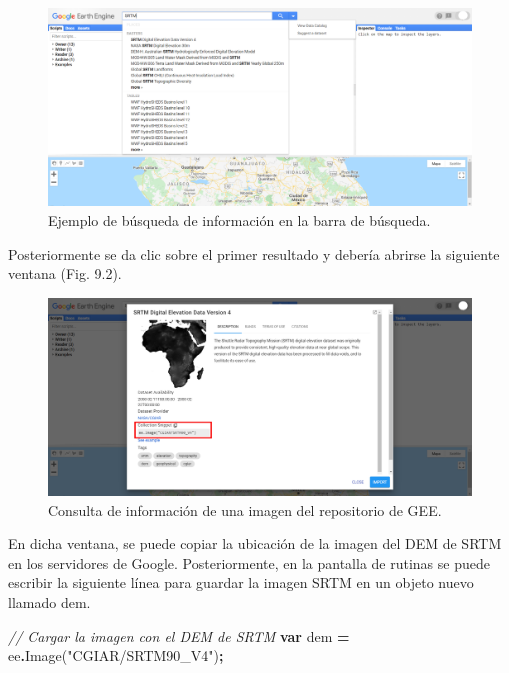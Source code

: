 \documentclass[
  12pt,
  letterpaper,
  twoside]{book}
\newenvironment{Shaded}{\begin{snugshade}}{\end{snugshade}}
\newcommand{\CommentTok}[1]{\textcolor[rgb]{0.56,0.35,0.01}{\textit{#1}}}
\newcommand{\FunctionTok}[1]{\textcolor[rgb]{0.00,0.00,0.00}{#1}}
\newcommand{\KeywordTok}[1]{\textcolor[rgb]{0.13,0.29,0.53}{\textbf{#1}}}
\newcommand{\NormalTok}[1]{#1}
\newcommand{\OperatorTok}[1]{\textcolor[rgb]{0.81,0.36,0.00}{\textbf{#1}}}
\newcommand{\StringTok}[1]{\textcolor[rgb]{0.31,0.60,0.02}{#1}}
\begin{document}
\begin{figure}[btp]

{\centering \includegraphics[width=1\linewidth]{Img/SRTM} 

}

\caption{Ejemplo de búsqueda de información en la barra de búsqueda.}\label{fig:unnamed-chunk-126}
\end{figure}

Posteriormente se da clic sobre el primer resultado y debería abrirse la siguiente ventana (Fig. 9.2).

\begin{figure}[btp]

{\centering \includegraphics[width=1\linewidth]{Img/SRTM_prop} 

}

\caption{Consulta de información de una imagen del repositorio de GEE.}\label{fig:unnamed-chunk-127}
\end{figure}

En dicha ventana, se puede copiar la ubicación de la imagen del DEM de SRTM en los servidores de Google. Posteriormente, en la pantalla de rutinas se puede escribir la siguiente línea para guardar la imagen SRTM en un objeto nuevo llamado dem.

\begin{Shaded}
\begin{Highlighting}[]
\CommentTok{// Cargar la imagen con el DEM de SRTM}
\KeywordTok{var}\NormalTok{ dem }\OperatorTok{=}\NormalTok{ ee}\OperatorTok{.}\FunctionTok{Image}\NormalTok{(}\StringTok{"CGIAR/SRTM90\_V4"}\NormalTok{)}\OperatorTok{;}
\end{Highlighting}
\end{Shaded}
\end{document}
